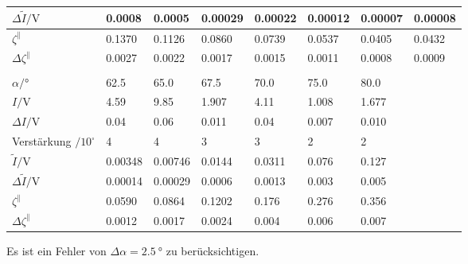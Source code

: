 \begin{center}
\begin{tabular}{@{} l  *{7}{l} @{}}
				$\Delta\tilde{I}/\si{\volt}$ & \num{0.0008} & \num{0.0005} & \num{0.00029} & \num{0.00022} & \num{0.00012} & \num{0.00007} & \num{0.00008} \\
				\midrule
				$\zeta^{\parallel}$          & \num{0.1370} & \num{0.1126} & \num{0.0860} & \num{0.0739} & \num{0.0537} & \num{0.0405} & \num{0.0432} \\
				$\Delta\zeta^{\parallel}$    & \num{0.0027} & \num{0.0022} & \num{0.0017} & \num{0.0015} & \num{0.0011} & \num{0.0008} & \num{0.0009} \\
				\bottomrule
				\\[-0.5em]
				\toprule
				$\alpha/\si{\degree}$        & \num{62.5} & \num{65.0} & \num{67.5} & \num{70.0} & \num{75.0} & \num{80.0} & \\
				\midrule
				$I/\si{\volt}$               & \num{4.59} & \num{9.85} & \num{1.907} & \num{4.11} & \num{1.008} & \num{1.677} & \\
				$\Delta I/\si{\volt}$        & \num{0.04} & \num{0.06} & \num{0.011} & \num{0.04} & \num{0.007} & \num{0.010} & \\
				Verstärkung $/10^\square$    & \num{4} & \num{4} & \num{3} & \num{3} & \num{2} & \num{2} & \\
				$\tilde{I}/\si{\volt}$       & \num{0.00348} & \num{0.00746} & \num{0.0144} & \num{0.0311} & \num{0.076} & \num{0.127} & \\
				$\Delta\tilde{I}/\si{\volt}$ & \num{0.00014} & \num{0.00029} & \num{0.0006} & \num{0.0013} & \num{0.003} & \num{0.005} & \\
				\midrule
				$\zeta^{\parallel}$          & \num{0.0590} & \num{0.0864} & \num{0.1202} & \num{0.176} & \num{0.276} & \num{0.356} & \\
				$\Delta\zeta^{\parallel}$    & \num{0.0012} & \num{0.0017} & \num{0.0024} & \num{0.004} & \num{0.006} & \num{0.007} & \\
				\bottomrule
			\end{tabular}
		\end{center}
		Es ist ein Fehler von $\Delta \alpha = \SI{2.5}{\degree}$ zu berücksichtigen.

